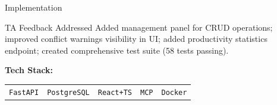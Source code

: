 \documentclass[10pt,aspectratio=169]{beamer}
\begin{document}
{\begin{frame}{Implementation}
    \vspace{8pt}
    \begin{block}{TA Feedback Addressed}
        Added management panel for CRUD operations; improved conflict warnings visibility in UI; added productivity statistics endpoint; created comprehensive test suite (58 tests passing).
    \end{block}

    \vspace{4pt}
    \begin{center}
        \textcolor{deepblue}{\textbf{Tech Stack:}} \quad
        \setlength{\tabcolsep}{6pt}
        \begin{tabular}{c c c c c}
            \colorbox{accentblue!15}{\texttt{FastAPI}} &
            \colorbox{accentgreen!15}{\texttt{PostgreSQL}} &
            \colorbox{accentorange!15}{\texttt{React+TS}} &
            \colorbox{accentred!15}{\texttt{MCP}} &
            \colorbox{deepblue!15}{\texttt{Docker}}
        \end{tabular}
    \end{center}
\end{frame}
}
\end{document}
